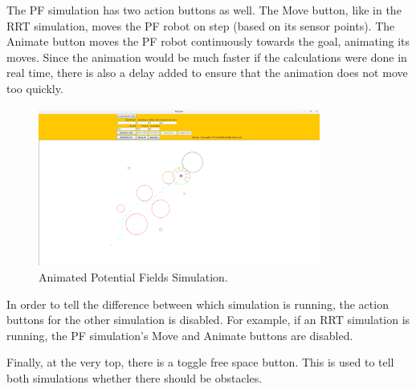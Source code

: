 \documentclass[12pt]{article}
\begin{document}
The PF simulation has two action buttons as well. The Move button, like in the RRT simulation, moves the PF robot on step (based on its sensor points). The Animate button moves the PF robot continuously towards the goal, animating its moves. Since the animation would be much faster if the calculations were done in real time, there is also a delay added to ensure that the animation does not move too quickly.

\begin{figure}
\centering
\includegraphics[width=350]{animate_pf.png}
\caption{Animated Potential Fields Simulation.}
\end{figure}

In order to tell the difference between which simulation is running, the action buttons for the other simulation is disabled. For example, if an RRT simulation is running, the PF simulation's Move and Animate buttons are disabled.

Finally, at the very top, there is a toggle free space button. This is used to tell both simulations whether there should be obstacles.
\end{document}
